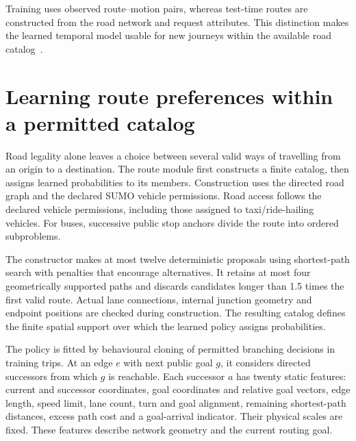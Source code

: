 
Training uses observed route--motion pairs, whereas test-time routes are constructed from the road network and request attributes. This distinction makes the learned temporal model usable for new journeys within the available road catalog~\cite{difftraj,diffrn}.

\section{Learning route preferences within a permitted catalog}
Road legality alone leaves a choice between several valid ways of travelling from an origin to a destination. The route module first constructs a finite catalog, then assigns learned probabilities to its members. Construction uses the directed road graph and the declared SUMO vehicle permissions. Road access follows the declared vehicle permissions, including those assigned to taxi/ride-hailing vehicles. For buses, successive public stop anchors divide the route into ordered subproblems.

The constructor makes at most twelve deterministic proposals using shortest-path search with penalties that encourage alternatives. It retains at most four geometrically supported paths and discards candidates longer than 1.5 times the first valid route. Actual lane connections, internal junction geometry and endpoint positions are checked during construction. The resulting catalog defines the finite spatial support over which the learned policy assigns probabilities.

The policy is fitted by behavioural cloning of permitted branching decisions in training trips. At an edge $e$ with next public goal $g$, it considers directed successors from which $g$ is reachable. Each successor $a$ has twenty static features: current and successor coordinates, goal coordinates and relative goal vectors, edge length, speed limit, lane count, turn and goal alignment, remaining shortest-path distances, excess path cost and a goal-arrival indicator. Their physical scales are fixed. These features describe network geometry and the current routing goal.

